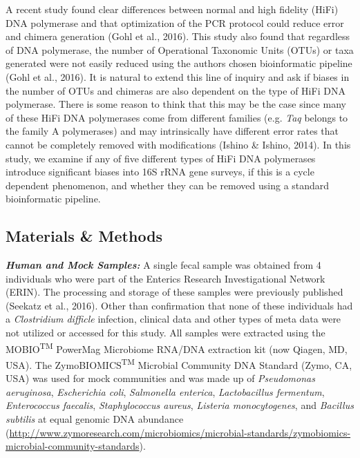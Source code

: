 \documentclass[12pt,]{article}
\begin{document}
A recent study found clear differences between normal and high fidelity
(HiFi) DNA polymerase and that optimization of the PCR protocol could
reduce error and chimera generation (Gohl et al., 2016). This study also
found that regardless of DNA polymerase, the number of Operational
Taxonomic Units (OTUs) or taxa generated were not easily reduced using
the authors chosen bioinformatic pipeline (Gohl et al., 2016). It is
natural to extend this line of inquiry and ask if biases in the number
of OTUs and chimeras are also dependent on the type of HiFi DNA
polymerase. There is some reason to think that this may be the case
since many of these HiFi DNA polymerases come from different families
(e.g. \emph{Taq} belongs to the family A polymerases) and may
intrinsically have different error rates that cannot be completely
removed with modifications (Ishino \& Ishino, 2014). In this study, we
examine if any of five different types of HiFi DNA polymerases introduce
significant biases into 16S rRNA gene surveys, if this is a cycle
dependent phenomenon, and whether they can be removed using a standard
bioinformatic pipeline.

\newpage

\subsection{Materials \& Methods}\label{materials-methods}

\textbf{\emph{Human and Mock Samples:}} A single fecal sample was
obtained from 4 individuals who were part of the Enterics Research
Investigational Network (ERIN). The processing and storage of these
samples were previously published (Seekatz et al., 2016). Other than
confirmation that none of these individuals had a \emph{Clostridium
difficle} infection, clinical data and other types of meta data were not
utilized or accessed for this study. All samples were extracted using
the MOBIO\textsuperscript{TM} PowerMag Microbiome RNA/DNA extraction kit
(now Qiagen, MD, USA). The ZymoBIOMICS\textsuperscript{TM} Microbial
Community DNA Standard (Zymo, CA, USA) was used for mock communities and
was made up of \emph{Pseudomonas aeruginosa}, \emph{Escherichia coli},
\emph{Salmonella enterica}, \emph{Lactobacillus fermentum},
\emph{Enterococcus faecalis}, \emph{Staphylococcus aureus},
\emph{Listeria monocytogenes}, and \emph{Bacillus subtilis} at equal
genomic DNA abundance
(\url{http://www.zymoresearch.com/microbiomics/microbial-standards/zymobiomics-microbial-community-standards}).
\end{document}
